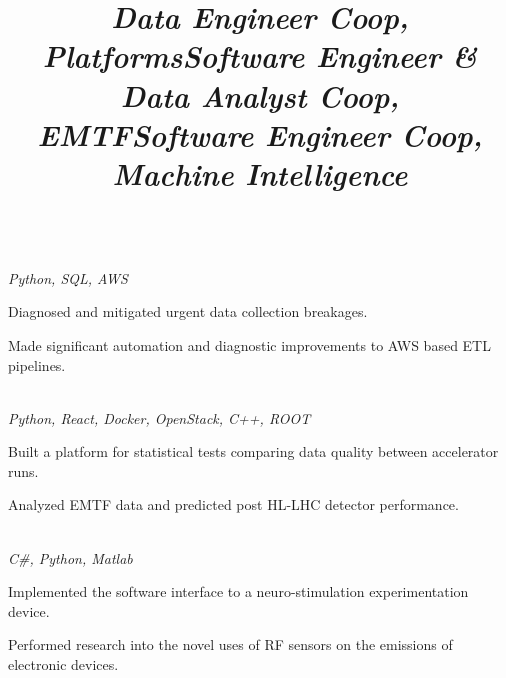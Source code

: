 \documentclass[margin,line,11pt,letterpaper]{style}
\begin{document}
\begin{resume}
    \title{\textit{Data Engineer Coop, Platforms}}
    \begin{position}
        \vspace{-3mm}\\
        \emph{Python, SQL, AWS}
        \begin{list2}
            \item Diagnosed and mitigated urgent data collection breakages. 
            \item Made significant automation and diagnostic improvements to AWS based ETL pipelines.
        \end{list2}
    \end{position}

    \title{\textit{Software Engineer \& Data Analyst Coop, EMTF}}
    \begin{position}
        \vspace{-3mm}\\
        \emph{Python, React, Docker, OpenStack, C++, ROOT}
        \begin{list2}
            \item Built a platform for statistical tests comparing data quality between accelerator runs.
            \item Analyzed EMTF data and predicted post HL-LHC detector performance.
        \end{list2}
    \end{position}

    \title{\textit{Software Engineer Coop, Machine Intelligence}}
    \begin{position}
        \vspace{-3mm}\\
        \emph{C\#, Python, Matlab}
        \begin{list2}
            \item Implemented the software interface to a neuro-stimulation experimentation device.
            \item Performed research into the novel uses of RF sensors on the emissions of electronic devices.
        \end{list2}
    \end{position}
    

\end{resume}
\end{document}

